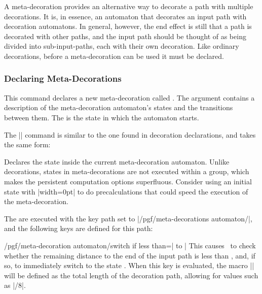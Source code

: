 \label{section-base-meta-decorations}

A meta-decoration provides an alternative way to decorate a path with
multiple decorations. It is, in essence, an automaton that decorates
an input path with decoration automatons. In general, however, the end
effect is still that a path is decorated with other paths, and the input
path should be thought of as being divided into sub-input-paths, each with
their own decoration. Like ordinary decorations, before a
meta-decoration can be used it must be declared.

\subsubsection{Declaring Meta-Decorations}

\begin{command}{\pgfdeclaremetadecorate{}}

  This command declares a new meta-decoration called . The
   argument contains a description of the meta-decoration
  automaton's states and the transitions between them. The
   is the state in which the automaton starts.

  The |\state| command is similar to the one found in
  decoration declarations, and takes the same form:

  \begin{command}{\state{}}
    Declares the state  inside the current meta-decoration
    automaton. Unlike decorations, states in meta-decorations are not
    executed within a group, which makes the persistent computation
    options superfluous. Consider using an initial state with
    |width=0pt| to do precalculations that could speed the execution
    of the meta-decoration.

    The  are executed with the key path set to
    |/pgf/meta-decorations automaton/|, and the following keys are defined for
    this path:

    \begin{key}{/pgf/meta-decoration automaton/switch if less than=| to |}
      This causes \pgfname\ to check whether the
      remaining distance to the end of the input path is less than
      , and, if so, to immediately switch to the state
      . When this key is evaluated, the macro
      |\pgfmetadecoratedpathlength| will be defined as the total length of
      the decoration path, allowing for values such as
      |\pgfmetadecoratedpathlength/8|.
    \end{key}


\end{command}
\end{command}
